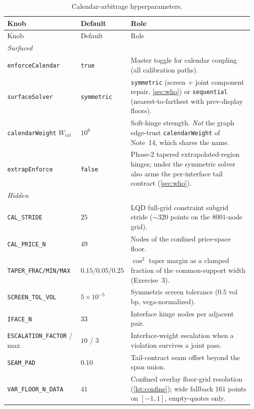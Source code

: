 \documentclass[11pt]{article}
\begin{document}
\begin{longtable}{p{}p{}p{}}
\caption{Calendar-arbitrage hyperparameters.}\label{tab:atlas}\\
\toprule Knob & Default & Role\\ \midrule
\endfirsthead \toprule Knob & Default & Role\\ \midrule \endhead
\multicolumn{3}{l}{\emph{Surfaced}}\\ \midrule
\texttt{enforceCalendar} & \texttt{true} & Master toggle for calendar
coupling (all calibration paths).\\
\texttt{surfaceSolver} & \texttt{symmetric} & \texttt{symmetric}
(screen + joint component repair, \cref{sec:who}) or
\texttt{sequential} (nearest-to-farthest with prev-display floors).\\
\texttt{calendarWeight} $W_{\mathrm{cal}}$ & $10^{6}$ & Soft-hinge
strength.  \emph{Not} the graph edge-trust \texttt{calendarWeight} of
Note~14, which shares the name.\\
\texttt{extrapEnforce} & \texttt{false} & Phase-2 tapered
extrapolated-region hinges; under the symmetric solver also arms the
per-interface tail contract (\cref{sec:who}).\\
\midrule
\multicolumn{3}{l}{\emph{Hidden}}\\ \midrule
\texttt{CAL\_STRIDE} & $25$ & LQD full-grid constraint subgrid stride
($\sim$320 points on the $8001$-node grid).\\
\texttt{CAL\_PRICE\_N} & $49$ & Nodes of the confined price-space
floor.\\
\texttt{TAPER\_FRAC/MIN/MAX} & $0.15/0.05/0.25$ & $\cos^{2}$ taper
margin as a clamped fraction of the common-support width
(Exercise~3).\\
\texttt{SCREEN\_TOL\_VOL} & $5\times10^{-5}$ & Symmetric screen
tolerance ($0.5$ vol bp, vega-normalized).\\
\texttt{IFACE\_N} & $33$ & Interface hinge nodes per adjacent pair.\\
\texttt{ESCALATION\_FACTOR} / max & $10$ / $3$ & Interface-weight
escalation when a violation survives a joint pass.\\
\texttt{SEAM\_PAD} & $0.10$ & Tail-contract seam offset beyond the span
union.\\
\texttt{VAR\_FLOOR\_N\_DATA} & $41$ & Confined overlay floor-grid
resolution (\cref{lst:confine}); wide fallback $161$ points on
$[-1,1]$, empty-quotes only.\\
\bottomrule
\end{longtable}
\end{document}
